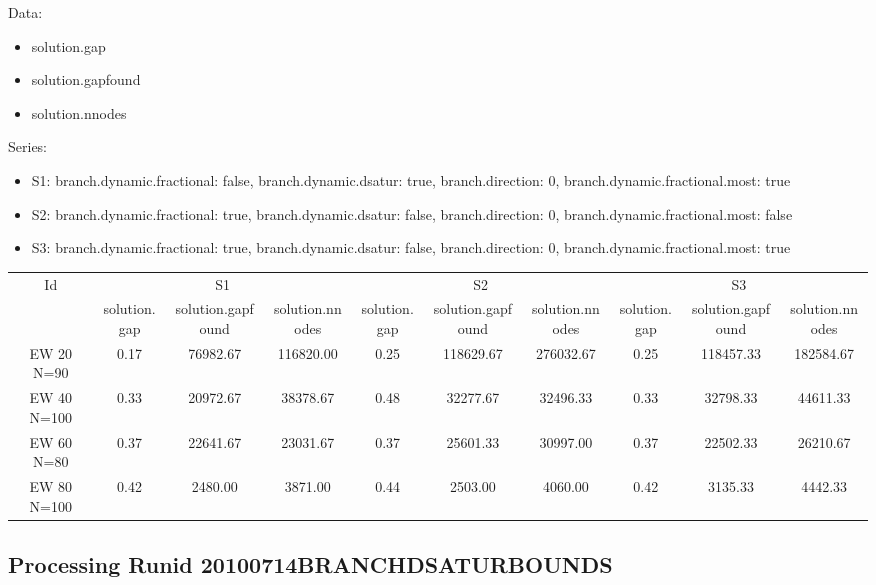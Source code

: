 \documentclass[landscape, 12pt]{report}
\begin{document}
	Data:
	\begin{itemize}
	\item solution.gap
	\item solution.gapfound
	\item solution.nnodes
	\end{itemize}
	Series:
	\begin{itemize}
	\item S1: branch.dynamic.fractional: false, branch.dynamic.dsatur: true, branch.direction: 0, branch.dynamic.fractional.most: true
	\item S2: branch.dynamic.fractional: true, branch.dynamic.dsatur: false, branch.direction: 0, branch.dynamic.fractional.most: false
	\item S3: branch.dynamic.fractional: true, branch.dynamic.dsatur: false, branch.direction: 0, branch.dynamic.fractional.most: true
	\end{itemize}
	\begin{tabular}{|c|ccc|ccc|ccc|}
	\hline
	\multicolumn{1}{|c|}{Id} & \multicolumn{3}{|c|}{S1} & \multicolumn{3}{|c|}{S2} & \multicolumn{3}{|c|}{S3}
	\\
	 & solution.gap & solution.gapfound & solution.nnodes & solution.gap & solution.gapfound & solution.nnodes & solution.gap & solution.gapfound & solution.nnodes
	\\
	\hline
	EW 20 N=90 & 0.17 & 76982.67 & 116820.00 & 0.25 & 118629.67 & 276032.67 & 0.25 & 118457.33 & 182584.67
	\\
	EW 40 N=100 & 0.33 & 20972.67 & 38378.67 & 0.48 & 32277.67 & 32496.33 & 0.33 & 32798.33 & 44611.33
	\\
	EW 60 N=80 & 0.37 & 22641.67 & 23031.67 & 0.37 & 25601.33 & 30997.00 & 0.37 & 22502.33 & 26210.67
	\\
	EW 80 N=100 & 0.42 & 2480.00 & 3871.00 & 0.44 & 2503.00 & 4060.00 & 0.42 & 3135.33 & 4442.33
	\\
	\hline 
	 \end{tabular}

\clearpage

\subsection{Processing Runid 20100714BRANCHDSATURBOUNDS}
\end{document}
